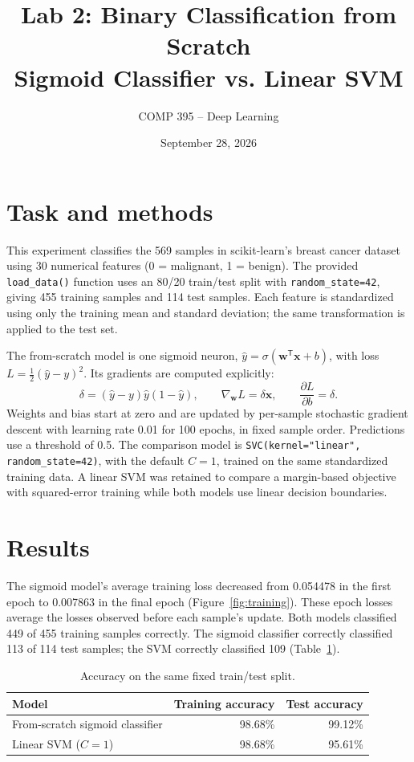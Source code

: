 \documentclass[11pt]{article}
\title{Lab 2: Binary Classification from Scratch\\\large Sigmoid Classifier vs. Linear SVM}
\author{COMP 395 -- Deep Learning}
\date{September 28, 2026}
\begin{document}
\maketitle
\vspace{-1.2em}

\section*{Task and methods}
This experiment classifies the 569 samples in scikit-learn's breast cancer
dataset using 30 numerical features (0 = malignant, 1 = benign). The provided
\texttt{load\_data()} function uses an 80/20 train/test split with
\texttt{random\_state=42}, giving 455 training samples and 114 test samples.
Each feature is standardized using only the training mean and standard
deviation; the same transformation is applied to the test set.

The from-scratch model is one sigmoid neuron,
$\hat y=\sigma(\mathbf{w}^{\mathsf T}\mathbf{x}+b)$, with loss
$L=\tfrac12(\hat y-y)^2$. Its gradients are computed explicitly:
\[
\delta=(\hat y-y)\hat y(1-\hat y),\qquad
\nabla_{\mathbf w}L=\delta\mathbf{x},\qquad
\frac{\partial L}{\partial b}=\delta.
\]
Weights and bias start at zero and are updated by per-sample stochastic
gradient descent with learning rate 0.01 for 100 epochs, in fixed sample
order. Predictions use a threshold of 0.5. The comparison model is
\texttt{SVC(kernel="linear", random\_state=42)}, with the default $C=1$,
trained on the same standardized training data. A linear SVM was retained
to compare a margin-based objective with squared-error training while both
models use linear decision boundaries.

\section*{Results}
The sigmoid model's average training loss decreased from 0.054478 in the
first epoch to 0.007863 in the final epoch (Figure~\ref{fig:training}).
These epoch losses average the losses observed before each sample's update.
Both models classified 449 of 455 training samples correctly.
The sigmoid classifier correctly classified 113 of 114 test samples;
the SVM correctly classified 109 (Table~\ref{tab:accuracy}).

\begin{table}[ht]
\centering
\caption{Accuracy on the same fixed train/test split.}
\label{tab:accuracy}
\begin{tabular}{lrr}
\toprule
Model & Training accuracy & Test accuracy \\
\midrule
From-scratch sigmoid classifier & 98.68\% & 99.12\% \\
Linear SVM ($C=1$) & 98.68\% & 95.61\% \\
\bottomrule
\end{tabular}
\end{table}
\end{document}
